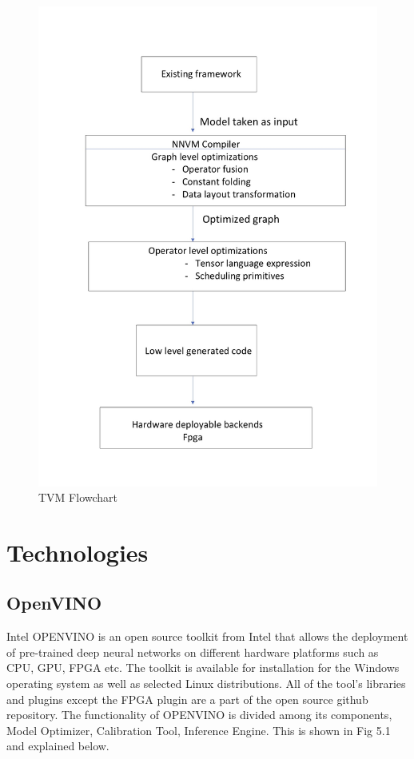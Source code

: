 \documentclass[titlepage]{report}
\begin{document}
\begin{figure}[h!]
    \centering
    \includegraphics[scale=0.15]{TVM_Flowchart.jpg}
    \caption{TVM Flowchart}
\end{figure}


\chapter{Technologies}

\section{OpenVINO}
Intel OPENVINO is an open source toolkit from Intel that allows the deployment of pre-trained deep neural networks on different hardware platforms such as CPU, GPU, FPGA etc. The toolkit is available for installation for the Windows operating system as well as selected Linux distributions. All of the tool's libraries and plugins except the FPGA plugin are a part of the open source github repository.
The functionality of OPENVINO is divided among its components, Model Optimizer, Calibration Tool,  Inference Engine. This is shown in Fig 5.1 and explained below. 
\end{document}
